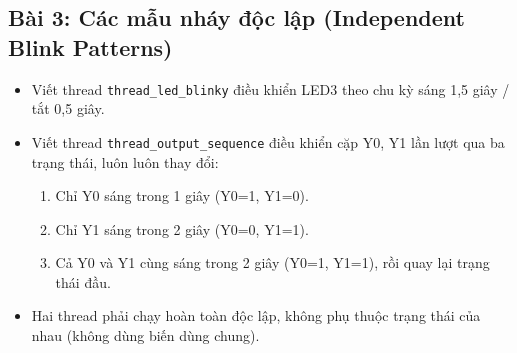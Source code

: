 \subsection{Bài 3: Các mẫu nháy độc lập (Independent Blink Patterns)}

\begin{tcolorbox}[
    enhanced,
    colback=black!2,
    colframe=black!60,
    boxrule=1pt,
    arc=2.5mm,
    drop shadow,
    attach boxed title to top left={xshift=4mm, yshift=-3mm},
    boxed title style={
        enhanced,
        colback=black!85,
        colframe=black!85,
        boxrule=1pt,
        arc=2.5mm,
        drop shadow,
        left=6pt, right=6pt, top=2pt, bottom=2pt
    },
    title=\textcolor{white}{\large\textbf{Yêu cầu đề bài (Trích phiếu bài tập)}}
]
\bfseries
\vspace{0.2cm}
\begin{itemize}
    \item Viết thread \texttt{thread\_led\_blinky} điều khiển LED3 theo chu kỳ sáng 1,5 giây / tắt 0,5 giây.
    \item Viết thread \texttt{thread\_output\_sequence} điều khiển cặp Y0, Y1 lần lượt qua ba trạng thái, luôn luôn thay đổi:
    \begin{enumerate}[label=\alph*.]
        \item Chỉ Y0 sáng trong 1 giây (Y0=1, Y1=0).
        \item Chỉ Y1 sáng trong 2 giây (Y0=0, Y1=1).
        \item Cả Y0 và Y1 cùng sáng trong 2 giây (Y0=1, Y1=1), rồi quay lại trạng thái đầu.
    \end{enumerate}
    \item Hai thread phải chạy hoàn toàn độc lập, không phụ thuộc trạng thái của nhau (không dùng biến dùng chung).
\end{itemize}
\end{tcolorbox}

\vspace{0.3cm}
